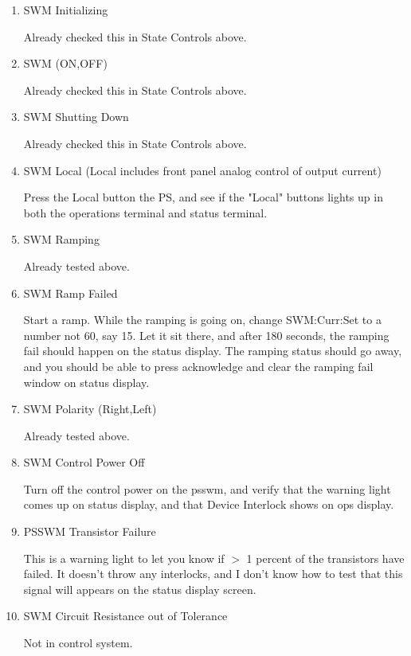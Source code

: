 \documentclass[11pt]{book}		%
\begin{document}
\begin{enumerate}

 \item SWM Initializing

\color{red}
Already checked this in State Controls above.
\color{black}

 \item SWM (ON,OFF)

\color{red}
Already checked this in State Controls above.
\color{black}

 \item SWM Shutting Down

\color{red}
Already checked this in State Controls above.
\color{black}

 \item SWM Local (Local includes front panel analog control of output current)

\color{red}
Press the Local button the PS, and see if the "Local" buttons lights up in both the operations terminal and status terminal.
\color{black}

 \item SWM Ramping

\color{red}
Already tested above.
\color{black}

 \item SWM Ramp Failed

\color{red}
Start a ramp. While the ramping is going on, change SWM:Curr:Set to a number not 60, say 15. Let it sit there, and after 180 seconds, the ramping fail should happen on the status display. The ramping status should go away, and you should be able to press acknowledge and clear the ramping fail window on status display.
\color{black}

 \item SWM Polarity (Right,Left)

\color{red}
Already tested above.
\color{black}

 \item SWM Control Power Off

\color{red}
Turn off the control power on the psswm, and verify that the warning light comes up on status display, and that Device Interlock shows on ops display.
\color{black}

 \item PSSWM Transistor Failure

\color{red}
This is a warning light to let you know if $>$ 1 percent of the transistors have failed. It doesn't throw any interlocks, and I don't know how to test that this signal will appears on the status display screen.
\color{black}

 \item SWM Circuit Resistance out of Tolerance

\color{red}
Not in control system.
\color{black}

\end{enumerate}
\end{document}
